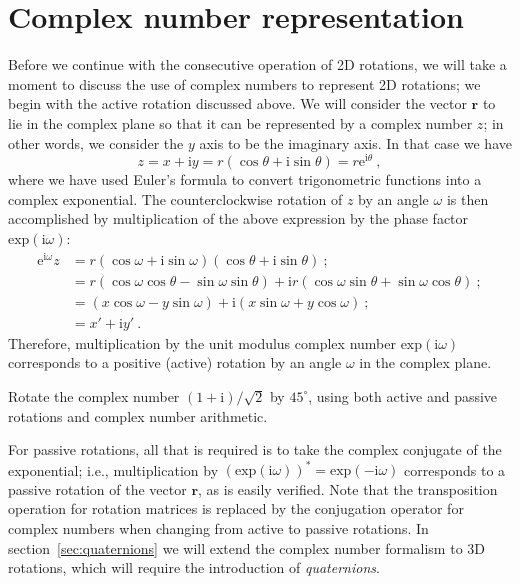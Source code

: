 \section{Complex number representation}
Before we continue with the consecutive operation of 2D rotations, we will take a moment to discuss the use of complex numbers to represent 2D rotations; we begin with the active rotation discussed above.  We will consider the vector $\mathbf{r}$ to lie in the complex plane so that it can be represented by a complex number $z$; in other words, we consider the $y$ axis to be the imaginary axis.  In that case we have 
\[
	z = x+\mathrm{i}y = r(\cos\theta+\mathrm{i}\sin\theta) = r \mathrm{e}^{\mathrm{i}\theta}\ ,
\]
where we have used Euler's formula to convert trigonometric functions into a complex exponential.  The counterclockwise rotation of $z$ by an angle $\omega$ is then accomplished by multiplication of the above expression by the phase factor $\text{exp}(\mathrm{i}\omega)$:
\begin{align*}
	\mathrm{e}^{\mathrm{i}\omega}z &=  r(\cos\omega+\mathrm{i}\sin\omega) (\cos\theta+\mathrm{i}\sin\theta)\ ; \\
	&=r(\cos\omega\cos\theta - \sin\omega\sin\theta) +\mathrm{i}r(\cos\omega\sin\theta+\sin\omega\cos\theta)\ ; \\
	&= (x\cos\omega - y\sin\omega) + \mathrm{i} (x\sin\omega + y\cos\omega)\ ; \\
	& = x' + \mathrm{i} y'\ .
\end{align*}
Therefore, multiplication by the unit modulus complex number $\text{exp}(\mathrm{i}\omega)$ corresponds to a positive (active) rotation by an angle $\omega$ in the complex plane.

\begin{exercise}
Rotate the complex number $(1+\mathrm{i})/\sqrt{2}$ by $45^{\circ}$, using both active and passive rotations and complex number arithmetic.
\end{exercise}

For passive rotations, all that is required is to take the complex conjugate of the exponential; i.e., multiplication by $\left(\text{exp}(\mathrm{i}\omega)\right)^{\ast}=\text{exp}(-\mathrm{i}\omega)$ corresponds to a passive rotation of the vector $\mathbf{r}$, as is easily verified.  Note that the transposition operation for rotation matrices is replaced by the conjugation operator for complex numbers when changing from active to passive rotations.  In section~\ref{sec:quaternions} we will extend the complex number formalism to 3D rotations, which will require the introduction of  \textit{quaternions}.

